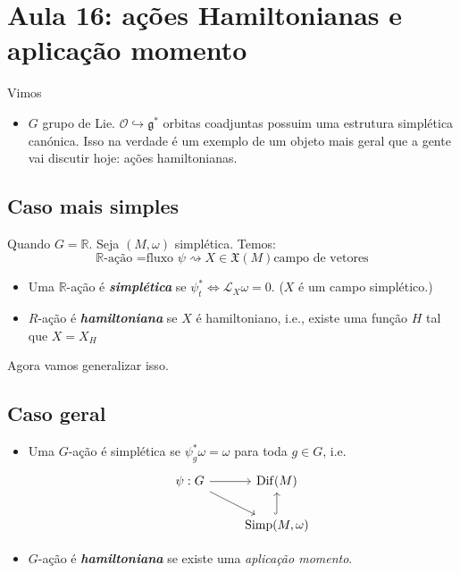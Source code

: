 \section{Aula 16: ações Hamiltonianas e aplicação momento}

Vimos
\begin{itemize}
\item $G$ grupo de Lie. $\mathcal{O}\hookrightarrow \mathfrak{g}^*$ orbitas coadjuntas possuim uma estrutura simplética canónica. Isso na verdade é um exemplo de um objeto mais geral que a gente vai discutir hoje: ações hamiltonianas.
\end{itemize}
\subsection{Caso mais simples}
Quando $G=\mathbb{R}$. Seja $(M,\omega)$ simplética. Temos:
\[\mathbb{R}\text{-ação =fluxo }\psi \rightsquigarrow X \in\mathfrak{X}(M) \text{campo de vetores}  \]
\begin{defn}\leavevmode
\begin{itemize}
\item Uma $\mathbb{R}$-ação é \textit{\textbf{simplética}} se $\psi_t^*\iff\mathcal{L}_{X}\omega=0$. ($X$ é um campo simplético.)
\item $R$-ação é \textit{\textbf{hamiltoniana}} se  $X$ é hamiltoniano, i.e., existe uma função $H$ tal que $X=X_H$
\end{itemize}
\end{defn}

Agora vamos generalizar isso.

\subsection{Caso geral}

\begin{defn}\leavevmode
	\begin{itemize}
	\item Uma $G$-ação é simplética se $\psi_{g}^*\omega=\omega$ para toda $g \in G$, i.e.
		\[\begin{tikzcd}
			 \psi:G\arrow[r]\arrow[dr]&\operatorname{Dif}(M)\\
			  &\operatorname{S im p}(M,\omega)\arrow[u,hook]
		\end{tikzcd}\]
		
	\item $G$-ação é \textit{\textbf{hamiltoniana}} se existe uma \textit{aplicação momento}.
	\end{itemize}
\end{defn}

